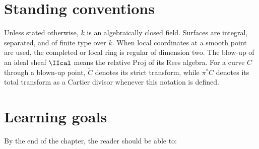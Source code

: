\section*{Standing conventions}
Unless stated otherwise, \(k\) is an algebraically closed field.  Surfaces are integral, separated, and of finite type over \(k\).  When local coordinates at a smooth point are used, the completed or local ring is regular of dimension two.  The blow-up of an ideal sheaf \(\IIcal\) means the relative Proj of its Rees algebra.  For a curve \(C\) through a blown-up point, \(\widetilde C\) denotes its strict transform, while \(\pi^*C\) denotes its total transform as a Cartier divisor whenever this notation is defined.

\section*{Learning goals}
By the end of the chapter, the reader should be able to:
